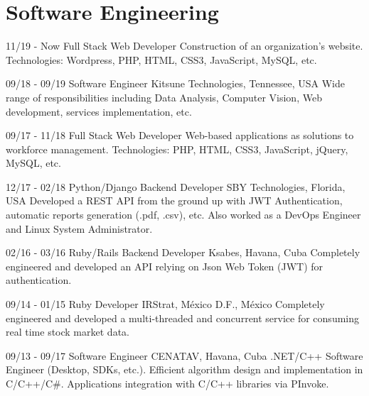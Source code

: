 \documentclass[]{friggeri-cv}
\begin{document}
\section{Software Engineering}
\begin{entrylist}
  \entry
    {11/19 - Now}
    {Full Stack Web Developer}
    {}
    {Construction of an organization's website. Technologies: Wordpress, PHP, HTML, CSS3, JavaScript, MySQL, etc.\\} 

  \entry
    {09/18 - 09/19}
    {Software Engineer}
    {Kitsune Technologies, Tennessee, USA}   
    {Wide range of responsibilities including Data Analysis, Computer Vision, Web development, services implementation, etc.\\}

  \entry
    {09/17 - 11/18}
    {Full Stack Web Developer}
    {}
    {Web-based applications as solutions to workforce management. Technologies: PHP, HTML, CSS3, JavaScript, jQuery, MySQL, etc.\\} 

  \entry
    {12/17 - 02/18}
    {Python/Django Backend Developer}
    {SBY Technologies, Florida, USA}   
    {Developed a REST API from the ground up with JWT Authentication, automatic reports generation (.pdf, .csv), etc. Also worked as a DevOps Engineer and Linux System Administrator.\\}    

  \entry
    {02/16 - 03/16}
    {Ruby/Rails Backend Developer}
    {Ksabes, Havana, Cuba}
    {Completely engineered and developed an API relying on Json Web Token (JWT) for authentication.\\}
  
  \entry
    {09/14 - 01/15}
    {Ruby Developer}
    {IRStrat, México D.F., México}
    {Completely engineered and developed a multi-threaded and concurrent service for consuming real time stock market data.\\}
    
  \entry
    {09/13 - 09/17}
    {Software Engineer}
    {CENATAV, Havana, Cuba}
    {.NET/C++ Software Engineer (Desktop, SDKs, etc.). Efficient algorithm design and implementation in C/C++/C\#. Applications integration with C/C++ libraries via PInvoke.\\}
\end{entrylist}
\end{document}
